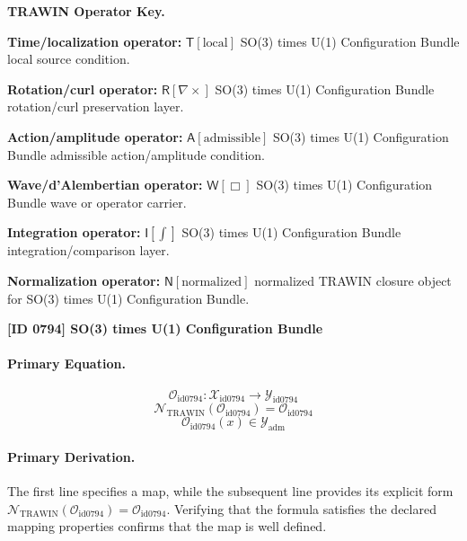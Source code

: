 \par\vspace{0.45\baselineskip}
\noindent\begin{minipage}[t]{\linewidth}
\begingroup
\small
\raggedright
\textbf{TRAWIN Operator Key.}\par
\noindent\textbf{Time/localization operator:} $\mathsf{T}\!\left[\mathrm{local}\right]$ SO(3) times U(1) Configuration Bundle local source condition.\par
\noindent\textbf{Rotation/curl operator:} $\mathsf{R}\!\left[\nabla\times\right]$ SO(3) times U(1) Configuration Bundle rotation/curl preservation layer.\par
\noindent\textbf{Action/amplitude operator:} $\mathsf{A}\!\left[\mathrm{admissible}\right]$ SO(3) times U(1) Configuration Bundle admissible action/amplitude condition.\par
\noindent\textbf{Wave/d'Alembertian operator:} $\mathsf{W}\!\left[\Box\right]$ SO(3) times U(1) Configuration Bundle wave or operator carrier.\par
\noindent\textbf{Integration operator:} $\mathsf{I}\!\left[\int\right]$ SO(3) times U(1) Configuration Bundle integration/comparison layer.\par
\noindent\textbf{Normalization operator:} $\mathsf{N}\!\left[\mathrm{normalized}\right]$ normalized TRAWIN closure object for SO(3) times U(1) Configuration Bundle.\par
\endgroup
\end{minipage}

\clearpage
\noindent\textbf{[ID 0794] SO(3) times U(1) Configuration Bundle}\par
\vspace{0.35em}
\paragraph{Primary Equation.}
\[
\mathcal{O}_{\mathrm{id0794}}:\mathcal{X}_{\mathrm{id0794}}\longrightarrow\mathcal{Y}_{\mathrm{id0794}}
\]
\[
\mathcal{N}_{\mathrm{TRAWIN}}(\mathcal{O}_{\mathrm{id0794}})=\mathcal{O}_{\mathrm{id0794}}
\]
\[
\mathcal{O}_{\mathrm{id0794}}(x)\in\mathcal{Y}_{\mathrm{adm}}
\]

\paragraph{Primary Derivation.}
The first line specifies a map, while the subsequent line provides its explicit form \( \mathcal{N}_{\mathrm{TRAWIN}}(\mathcal{O}_{\mathrm{id0794}})=\mathcal{O}_{\mathrm{id0794}} \). Verifying that the formula satisfies the declared mapping properties confirms that the map is well defined.
